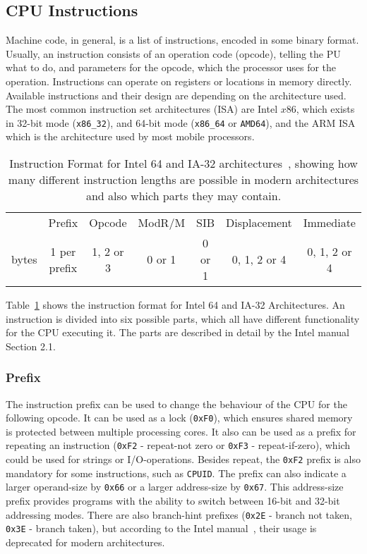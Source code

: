 \subsection{CPU Instructions}

Machine code, in general, is a list of instructions, encoded in some binary
format. Usually, an instruction consists of an operation code (opcode), telling
the PU what to do, and parameters for the opcode, which the processor uses for
the operation. Instructions can operate on registers or locations in memory
directly. Available instructions and their design are depending on the
architecture used. The most common instruction set architectures (ISA) are Intel
$x86$, which exists in 32-bit mode (\texttt{x86\_32}), and 64-bit mode
(\texttt{x86\_64} or \texttt{AMD64}), and the ARM ISA which is the architecture
used by most mobile processors.

\begin{table}[!htb]
\centering
\begin{tabular}{ccccccc}
\cline{2-7}
\multicolumn{1}{c|}{} & \multicolumn{1}{c|}{Prefix} &
\multicolumn{1}{c|}{Opcode} & \multicolumn{1}{c|}{ModR/M} &
\multicolumn{1}{c|}{SIB} & \multicolumn{1}{c|}{Displacement} &
\multicolumn{1}{c|}{Immediate} \\ \cline{2-7}
bytes         & 1 per prefix                & 1, 2 or 3
 & 0 or 1                      & 0 or 1                   & 0, 1, 2 or 4
             & 0, 1, 2 or 4
\end{tabular}
\caption{Instruction Format for Intel 64 and IA-32
architectures~\cite{intelsys}, showing how many different instruction lengths
are possible in modern architectures and also which parts they may contain.}
\label{tab:instrfor}
\end{table}

Table~\ref{tab:instrfor} shows the instruction format for Intel 64 and IA-32
Architectures. An instruction is divided into six possible parts, which all have
different functionality for the CPU executing it. The parts are described in
detail by the Intel manual~\cite{intelsys} Section 2.1.

\subsubsection{Prefix}

The instruction prefix can be used to change the behaviour of the CPU for the
following opcode. It can be used as a lock (\texttt{0xF0}), which ensures shared
memory is protected between multiple processing cores. It also can be used as a
prefix for repeating an instruction (\texttt{0xF2} - repeat-not zero or
\texttt{0xF3} - repeat-if-zero), which could be used for strings or
I/O-operations. Besides repeat, the \texttt{0xF2} prefix is also mandatory for
some instructions, such as \texttt{CPUID}. The prefix can also indicate a larger
operand-size by \texttt{0x66} or a larger address-size by \texttt{0x67}. This
address-size prefix provides programs with the ability to switch between 16-bit
and 32-bit addressing modes. There are also branch-hint prefixes (\texttt{0x2E}
- branch not taken, \texttt{0x3E} - branch taken), but according to the Intel
manual~\cite{intelsys}, their usage is deprecated for modern architectures.

